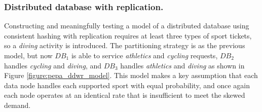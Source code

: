 \documentclass[runningheads]{llncs}
\begin{document}
%
%
\FloatBarrier
\subsubsection{Distributed database with replication.}  Constructing and meaningfully testing a model of a distributed database using consistent hashing with replication requires at least three types of sport tickets, so a {\itshape diving} activity is introduced.  The partitioning strategy is as the previous model, but now $\mathit{DB_1}$ is able to service {\itshape athletics} and {\itshape cycling} requests,  $\mathit{DB_2}$ handles {\itshape cycling} and {\itshape diving}, and $\mathit{DB_3}$ handles {\itshape athletics} and {\itshape diving} as shown in Figure \ref{figure:pepa_ddwr_model}.  This model makes a key assumption that each data node handles each supported sport with equal probability, and once again each node operates at an identical rate that is insufficient to meet the skewed demand.
\end{document}
